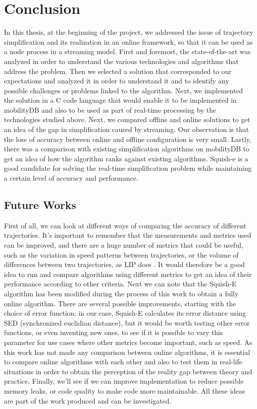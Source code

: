 
\chapter{Conclusion}

In this thesis, at the beginning of the project, we addressed the issue of trajectory simplification and its realization in an online framework, so that it can be used as a node process in a streaming model. First and foremost, the state-of-the-art was analyzed in order to understand the various technologies and algorithms that address the problem. Then we selected a solution that corresponded to our expectations and analyzed it in order to understand it and to identify any possible challenges or problems linked to the algorithm. Next, we implemented the solution in a C code language that would enable it to be implemented in mobilityDB and also to be used as part of real-time processing by the technologies studied above. Next, we compared offline and online solutions to get an idea of the gap in simplification caused by streaming. Our observation is that the loss of accuracy between online and offline configuration is very small.  Lastly, there was a comparison with existing simplification algorithms on mobilityDB to get an idea of how the algorithm ranks against existing algorithms. Squish-e is a good candidate for solving the real-time simplification problem while maintaining a certain level of accuracy and performance. 



\section{Future Works}
First of all, we can look at different ways of comparing the accuracy of different trajectories. It's important to remember that the measurements and metrics used can be improved, and there are a huge number of metrics that could be useful, such as the variation in speed patterns between trajectories, or the volume of differences between two trajectories, as LIP does \cite{4438678}. It would therefore be a good idea to run and compare algorithms using different metrics to get an idea of their performance according to other criteria. Next we can note that the Squish-E algorithm has been modified during the process of this work to obtain a fully online algorithm. There are several possible improvements, starting with the choice of error function: in our case, Squish-E calculates its error distance using SED (synchronized euclidian distance), but it would be worth testing other error functions, or even inventing new ones, to see if it is possible to vary this parameter for use cases where other metrics become important, such as speed. As this work has not made any comparison between online algorithms, it is essential to compare online algorithms with each other and also to test them in real-life situations in order to obtain the perception of the reality gap between theory and practice. Finally, we'll see if we can improve implementation to reduce possible memory leaks, or code quality to make code more maintainable. All these ideas are part of the work produced and can be investigated. 

